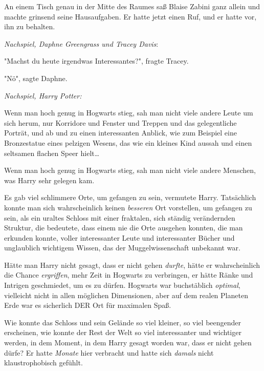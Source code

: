 {An einem Tisch genau in der Mitte des Raumes saß Blaise Zabini ganz allein und machte grinsend seine Hausaufgaben. Er hatte jetzt einen Ruf, und er hatte vor, ihn zu behalten.

\emph{Nachspiel, Daphne Greengrass und Tracey Davis}:

"Machst du heute irgendwas Interessantes?", fragte Tracey.

"Nö", sagte Daphne.

\emph{Nachspiel, Harry Potter:}

Wenn man hoch genug in Hogwarts stieg, sah man nicht viele andere Leute um sich herum, nur Korridore und Fenster und Treppen und das gelegentliche Porträt, und ab und zu einen interessanten Anblick, wie zum Beispiel eine Bronzestatue eines pelzigen Wesens, das wie ein kleines Kind aussah und einen seltsamen flachen Speer hielt…

Wenn man hoch genug in Hogwarts stieg, sah man nicht viele andere Menschen, was Harry sehr gelegen kam.

Es gab viel schlimmere Orte, um gefangen zu sein, vermutete Harry. Tatsächlich konnte man sich wahrscheinlich keinen \emph{besseren} Ort vorstellen, um gefangen zu sein, als ein uraltes Schloss mit einer fraktalen, sich ständig verändernden Struktur, die bedeutete, dass einem nie die Orte ausgehen konnten, die man erkunden konnte, voller interessanter Leute und interessanter Bücher und unglaublich wichtigem Wissen, das der Muggelwissenschaft unbekannt war.

Hätte man Harry nicht gesagt, dass er nicht gehen \emph{durfte}, hätte er wahrscheinlich die Chance \emph{ergriffen}, mehr Zeit in Hogwarts zu verbringen, er hätte Ränke und Intrigen geschmiedet, um es zu dürfen. Hogwarts war buchstäblich \emph{optimal}, vielleicht nicht in allen möglichen Dimensionen, aber auf dem realen Planeten Erde war es sicherlich DER Ort für maximalen Spaß.

Wie konnte das Schloss und sein Gelände so viel kleiner, so viel beengender erscheinen, wie konnte der Rest der Welt so viel interessanter und wichtiger werden, in dem Moment, in dem Harry gesagt worden war, dass er nicht gehen dürfe? Er hatte \emph{Monate} hier verbracht und hatte sich \emph{damals} nicht klaustrophobisch gefühlt.

}

